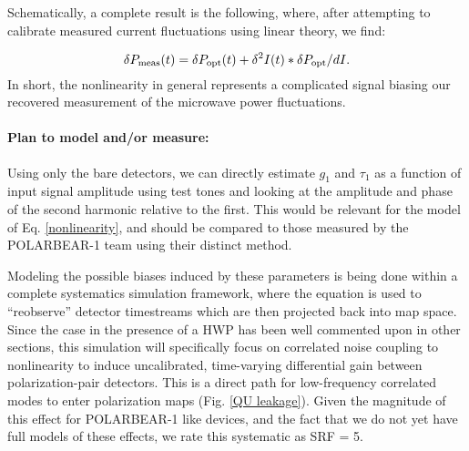 Schematically, a complete result is the following, where, after attempting to calibrate measured current fluctuations using linear theory, we find:

\begin{equation}
\delta P_{\mbox{\scriptsize meas}} (t) = \delta P_{\mbox{\scriptsize opt}} (t) + \delta^2 I (t) * \delta P_{\mbox{\scriptsize opt}}/dI.
\label{nonlinear_sum}
\end{equation}
In short, the nonlinearity in general represents a complicated signal biasing our recovered measurement of the microwave power fluctuations.

\paragraph{Plan to model and/or measure:}
Using only the bare detectors, we can directly estimate $g_1$ and $\tau_1$ as a function of input signal amplitude using test tones and looking at the amplitude and phase of the second harmonic relative to the first. This would be relevant for the model of Eq. \ref{nonlinearity}, and should be compared to those measured by the POLARBEAR-1 team using their distinct method.

Modeling the possible biases induced by these parameters is being done within a complete systematics simulation framework, where the equation is used to ``reobserve'' detector timestreams which are then projected back into map space. Since the case in the presence of a HWP has been well commented upon in other sections, this simulation will specifically focus on correlated noise coupling to nonlinearity to induce uncalibrated, time-varying differential gain between polarization-pair detectors. This is a direct path for low-frequency correlated modes to enter polarization maps (Fig. \ref{QU leakage}). Given the magnitude of this effect for POLARBEAR-1 like devices, and the fact that we do not yet have full models of these effects, we rate this systematic as SRF = 5.


